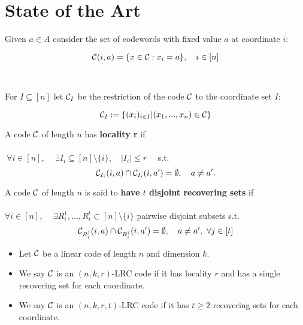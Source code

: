 \section{State of the Art}
\begin{frame}
    Given $a \in A$ consider the set of codewords with fixed value $a$ at coordinate $i$:

    $$ \mathcal{C} (i,a) = \{ x \in \mathcal{C} : x_i = a \}, \quad i \in [n] $$ \\~\\
    
    For $I \subseteq [n]$ let $\mathcal{C}_I$ be the restriction of the code $\mathcal{C}$ to the coordinate set $I$:
    
    $$\mathcal{C}_I := \{(x_i)_{ i \in I } \vert (x_1, ..., x_n) \in \mathcal{C}\}$$
    
        
\end{frame}

\begin{frame}
    \begin{defn}
        A code $\mathcal{C}$ of length $n$ has \textbf{locality r} if \\~\\
        
        $\ \forall i \in [n ]$, $\quad \exists I_i \subseteq [n] \setminus \{i\}, \quad \vert I_i \vert \leq r \quad $ s.t.         
        $$\mathcal{C}_{I_i} (i,a) \cap \mathcal{C}_{I_i} (i,a') = \emptyset, \quad a \neq a'.$$
    \end{defn}
    
	\begin{defn}
	    A code $\mathcal{C}$ of length $n$ is said to \textbf{have $t$ disjoint recovering sets} if \\~\\
	    
	    $\forall i \in [n]$, $\quad \exists R_i^1, ..., R_i^t \subset [n] \setminus \{i\}$ pairwise disjoint subsets
	    s.t. 
	    $$\mathcal{C}_{R_i^j} (i,a) \cap \mathcal{C}_{R_i^j} (i,a') = \emptyset, \quad a \neq a', \ \forall j \in [t]$$
	\end{defn}
\end{frame}

\begin{frame}
\begin{itemize}
\item Let $\mathcal{C}$ be a linear code of length $n$ and dimension $k$.

\item We say $\mathcal{C}$ is an $(n,k,r)$-LRC code if it has locality $r$ and has a single recovering set for each coordinate.

\item We say $\mathcal{C}$ is an $(n,k,r,t)$-LRC code if it has $t \geq 2$ recovering sets for each coordinate.
\end{itemize}
\end{frame}

